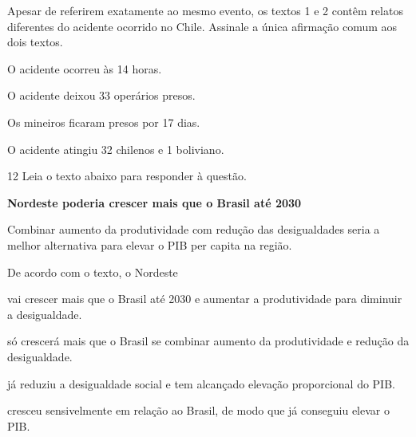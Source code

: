 Apesar de referirem exatamente ao mesmo evento, os textos 1 e 2 contêm  
relatos diferentes do acidente ocorrido no Chile. Assinale a única afirmação
comum aos dois textos. 

\begin{escolha}

    \item O acidente ocorreu às 14 horas.

    \item O acidente deixou 33 operários presos.

    \item Os mineiros ficaram presos por 17 dias.

    \item O acidente atingiu 32 chilenos e 1 boliviano.

\end{escolha}

\num{12} Leia o texto abaixo para responder à questão. 

\begin{myquote}

\textbf{Nordeste poderia crescer mais que o Brasil até 2030}

Combinar aumento da produtividade com redução das desigualdades seria a
melhor alternativa para elevar o PIB per capita na região.


\end{myquote}

De acordo com o texto, o Nordeste

\begin{escolha}
    
    \item vai crescer mais que o Brasil até 2030 e aumentar a produtividade para diminuir a desigualdade.
    
    \item só crescerá mais que o Brasil se combinar aumento da produtividade e redução da desigualdade. 
    
    \item já reduziu a desigualdade social e tem alcançado elevação proporcional do PIB.
    
    \item cresceu sensivelmente em relação ao Brasil, de modo que já conseguiu elevar o PIB.

\end{escolha}

